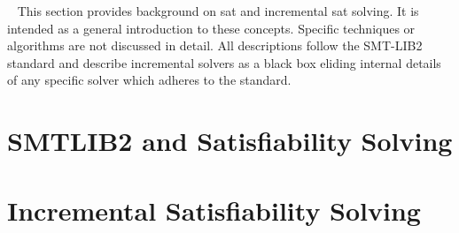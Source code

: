 ~\label{chapter:background}
%
This section provides background on \ac{sat} and incremental \ac{sat} solving.
It is intended as a general introduction to these concepts. Specific techniques
or algorithms are not discussed in detail. All descriptions follow the
SMT-LIB2~\cite{BarFT-SMTLIB} standard and describe incremental solvers as a
black box eliding internal details of any specific solver which adheres to the
standard.
%
\section{SMTLIB2 and Satisfiability Solving}

%
\section{Incremental Satisfiability Solving}


